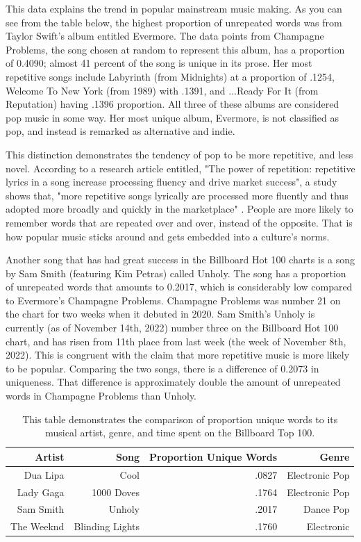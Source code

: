 \documentclass[12pt]{article}
\begin{document}
This data explains the trend in popular mainstream music making. As you can see from the table below, the highest proportion of unrepeated words was from Taylor Swift's album entitled Evermore. The data points from Champagne Problems, the song chosen at random to represent this album, has a proportion of 0.4090; almost 41 percent of the song is unique in its prose. Her most repetitive songs include Labyrinth (from Midnights) at a proportion of .1254, Welcome To New York (from 1989) with .1391, and ...Ready For It (from Reputation) having .1396 proportion. All three of these albums are considered pop music in some way. Her most unique album, Evermore, is not classified as pop, and instead is remarked as alternative and indie. 

This distinction demonstrates the tendency of pop to be more repetitive, and less novel. According to a research article entitled, "The power of repetition: repetitive lyrics in a song increase processing fluency and drive market success", a study shows that, "more repetitive songs lyrically are processed more fluently and thus adopted more broadly and quickly in the marketplace" \citep{Nunes2015power}. People are more likely to remember words that are repeated over and over, instead of the opposite. That is how popular music sticks around and gets embedded into a culture's norms. 

Another song that has had great success in the Billboard Hot 100 charts is a song by Sam Smith (featuring Kim Petras) called Unholy. The song has a proportion of unrepeated words that amounts to 0.2017, which is considerably low compared to Evermore's Champagne Problems. Champagne Problems was number 21 on the chart for two weeks when it debuted in 2020. Sam Smith's Unholy is currently (as of November 14th, 2022) number three on the Billboard Hot 100 chart, and has risen from 11th place from last week (the week of November 8th, 2022). This is congruent with the claim that more repetitive music is more likely to be popular. Comparing the two songs, there is a difference of 0.2073 in uniqueness. That difference is approximately double the amount of unrepeated words in Champagne Problems than Unholy. 



\begin{table}[tbp]
  \caption{This table demonstrates the comparison of proportion unique words to its musical artist, genre, and time spent on the Billboard Top 100.}
  \label{tab:rv}
\centering
\begin{tabular}{rrrr}
  \toprule
Artist & Song & Proportion Unique Words & Genre \\ 
  \midrule
Dua Lipa & Cool & .0827 & Electronic Pop \\ 
  Lady Gaga & 1000 Doves  & .1764 & Electronic Pop \\ 
  Sam Smith & Unholy & .2017 & Dance Pop \\ 
  The Weeknd & Blinding Lights & .1760 & Electronic \\ 
     \bottomrule
\end{tabular}
\end{table}
\end{document}
